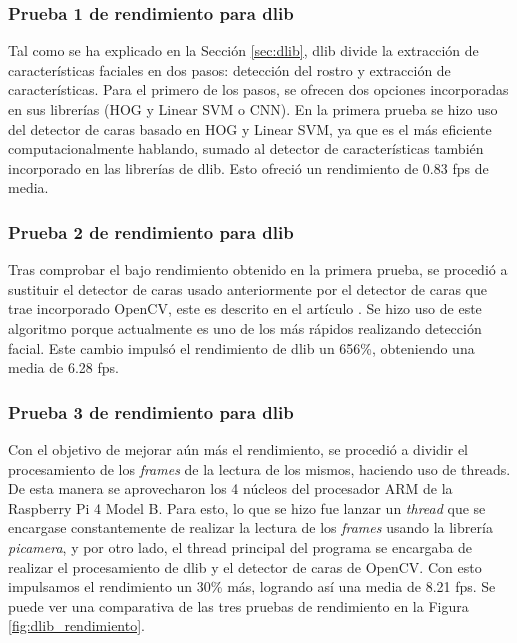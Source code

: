 \subsubsection{Prueba 1 de rendimiento para dlib}

Tal como se ha explicado en la Sección \ref{sec:dlib}, dlib divide la extracción de características faciales en dos pasos: detección del rostro y extracción de características. Para el primero de los pasos, se ofrecen dos opciones incorporadas en sus librerías (HOG y Linear SVM o CNN). En la primera prueba se hizo uso del detector de caras basado en HOG y Linear SVM, ya que es el más eficiente computacionalmente hablando, sumado al detector de características también incorporado en las librerías de dlib. Esto ofreció un rendimiento de 0.83 fps de media.

\subsubsection{Prueba 2 de rendimiento para dlib}

Tras comprobar el bajo rendimiento obtenido en la primera prueba, se procedió a sustituir el detector de caras usado anteriormente por el detector de caras que trae incorporado OpenCV, este es descrito en el artículo \cite{opencv_haar_cascade}. Se hizo uso de este algoritmo porque actualmente es uno de los más rápidos realizando detección facial. Este cambio impulsó el rendimiento de dlib un 656\%, obteniendo una media de 6.28 fps.

\subsubsection{Prueba 3 de rendimiento para dlib}
Con el objetivo de mejorar aún más el rendimiento, se procedió a dividir el procesamiento de los \textit{frames} de la lectura de los mismos, haciendo uso de threads. De esta manera se aprovecharon los 4 núcleos del procesador ARM de la Raspberry Pi 4 Model B. Para esto, lo que se hizo fue lanzar un \textit{thread} que se encargase constantemente de realizar la lectura de los \textit{frames} usando la librería \textit{picamera}, y por otro lado, el thread principal del programa se encargaba de realizar el procesamiento de dlib y el detector de caras de OpenCV. Con esto impulsamos el rendimiento un 30\% más, logrando así una media de 8.21 fps. Se puede ver una comparativa de las tres pruebas de rendimiento en la Figura \ref{fig:dlib_rendimiento}.

